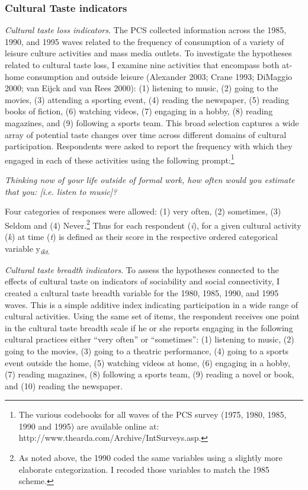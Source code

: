 \documentclass[
]{article}
\begin{document}
\subsubsection{Cultural Taste indicators}\label{cultural-taste-indicators}

\emph{Cultural taste loss indicators}. The PCS collected information across the 1985, 1990, and 1995 waves related to the frequency of consumption of a variety of leisure culture activities and mass media outlets. To investigate the hypotheses related to cultural taste loss, I examine nine activities that encompass both at-home consumption and outside leisure (Alexander 2003; Crane 1993; DiMaggio 2000; van Eijck and van Rees 2000): (1) listening to music, (2) going to the movies, (3) attending a sporting event, (4) reading the newspaper, (5) reading books of fiction, (6) watching videos, (7) engaging in a hobby, (8) reading magazines, and (9) following a sports team. This broad selection captures a wide array of potential taste changes over time across different domains of cultural participation. Respondents were asked to report the frequency with which they engaged in each of these activities using the following prompt:\footnote{The various codebooks for all waves of the PCS survey (1975, 1980, 1985, 1990 and 1995) are available online at: http://www.thearda.com/Archive/IntSurveys.asp.}

\emph{Thinking now of your life outside of formal work, how often would you estimate that you: [i.e. listen to music]?}

Four categories of responses were allowed: (1) very often, (2) sometimes, (3) Seldom and (4) Never.\footnote{As noted above, the 1990 coded the same variables using a slightly more elaborate categorization. I recoded those variables to match the 1985 scheme.} Thus for each respondent (\emph{i}), for a given cultural activity (\emph{k}) at time (\emph{t}) is defined as their score in the respective ordered categorical variable y\textsubscript{\emph{ikt}.}

\emph{Cultural taste breadth indicators}. To assess the hypotheses connected to the effects of cultural taste on indicators of sociability and social connectivity, I created a cultural taste breadth variable for the 1980, 1985, 1990, and 1995 waves. This is a simple additive index indicating participation in a wide range of cultural activities. Using the same set of items, the respondent receives one point in the cultural taste breadth scale if he or she reports engaging in the following cultural practices either ``very often'' or ``sometimes'': (1) listening to music, (2) going to the movies, (3) going to a theatric performance, (4) going to a sports event outside the home, (5) watching videos at home, (6) engaging in a hobby, (7) reading magazines, (8) following a sports team, (9) reading a novel or book, and (10) reading the newspaper.
\end{document}

